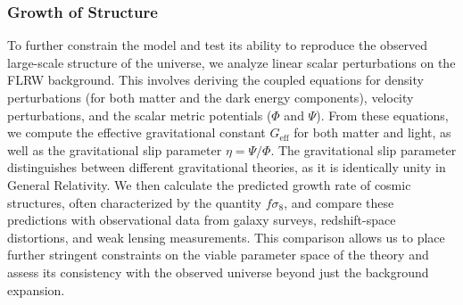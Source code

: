 \documentclass[twocolumn]{aastex631}
\begin{document}
\subsubsection{Growth of Structure}
To further constrain the model and test its ability to reproduce the observed large-scale structure of the universe, we analyze linear scalar perturbations on the FLRW background. This involves deriving the coupled equations for density perturbations (for both matter and the dark energy components), velocity perturbations, and the scalar metric potentials ($\Phi$ and $\Psi$). From these equations, we compute the effective gravitational constant $G_{\text{eff}}$ for both matter and light, as well as the gravitational slip parameter $\eta = \Psi/\Phi$. The gravitational slip parameter distinguishes between different gravitational theories, as it is identically unity in General Relativity. We then calculate the predicted growth rate of cosmic structures, often characterized by the quantity $f\sigma_8$, and compare these predictions with observational data from galaxy surveys, redshift-space distortions, and weak lensing measurements. This comparison allows us to place further stringent constraints on the viable parameter space of the theory and assess its consistency with the observed universe beyond just the background expansion.
\end{document}
